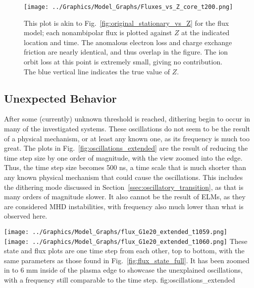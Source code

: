 \begin{figure}[!b] %
	\centering
	\texttt{[image: ../Graphics/Model\_Graphs/Fluxes\_vs\_Z\_core\_t200.png]}
	\caption{This plot is akin to Fig.~\ref{fig:original_stationary_vs_Z} for the flux model; each nonambipolar flux is plotted against $Z$ at the indicated location and time.
	The anomalous electron loss and charge exchange friction are nearly identical, and thus overlap in the figure.
	The ion orbit loss at this point is extremely small, giving no contribution.
	The blue vertical line indicates the true value of $Z$.}
	\label{fig:fluxes_steady-state}
\end{figure}

\subsection{Unexpected Behavior} \label{ssec:unexpected}
After some (currently) unknown threshold is reached, dithering begin to occur in many of the investigated systems.
These oscillations do not seem to be the result of a physical mechanism, or at least any known one, as its frequency is much too great.
The plots in Fig.~\ref{fig:oscillations_extended} are the result of reducing the time step size by one order of magnitude, with the view zoomed into the edge.
Thus, the time step size becomes 500 ns, a time scale that is much shorter than any known physical mechanism that could cause the oscillations.
This includes the dithering mode discussed in Section~\ref{ssec:oscillatory_transition}, as that is many orders of magnitude slower.
It also cannot be the result of ELMs, as they are considered MHD instabilities, with frequency also much lower than what is observed here.

	{\texttt{[image: ../Graphics/Model\_Graphs/flux\_G1e20\_extended\_t1059.png]}
	\texttt{[image: ../Graphics/Model\_Graphs/flux\_G1e20\_extended\_t1060.png]}}
	{These state and flux plots are one time step from each other, top to bottom, with the same parameters as those found in Fig.~\ref{fig:flux_state_full}.
	It has been zoomed in to 6 mm inside of the plasma edge to showcase the unexplained oscillations, with a frequency still comparable to the time step.}
	{fig:oscillations_extended}

